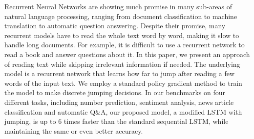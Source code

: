 Recurrent Neural Networks are showing much promise in many sub-areas of natural language processing, ranging from document classification to machine translation to automatic question answering. Despite their promise, many recurrent models have to read the whole text word by word, making it slow to handle long documents. For example, it is difficult to use a recurrent network to read a book and answer questions about it. In this paper, we present an approach of reading text while skipping irrelevant information if needed. The underlying model is a recurrent network that learns how far to jump after reading a few words of the input text. We employ a standard policy gradient method to train the model to make discrete jumping decisions. In our benchmarks on four different tasks, including number prediction, sentiment analysis, news article classification and automatic Q\&A, our proposed model, a modified LSTM with jumping, is up to 6 times faster than the standard sequential LSTM, while maintaining the same or even better accuracy.
